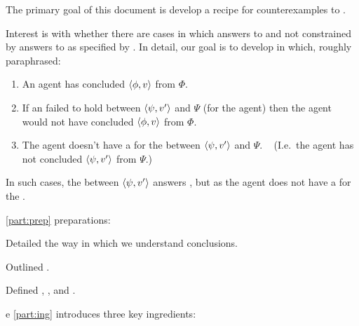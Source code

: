 \begin{note}
  The primary goal of this document is develop a recipe for counterexamples to \issueConstraint{}.

  Interest is with whether there are cases in which answers to \qWhyV{} and not constrained by answers to \qHowV{} as specified by \issueConstraint{}.
  In detail, our goal is to develop  in which, roughly paraphrased:

  \begin{enumerate}
  \item
    An agent has concluded \(\langle \phi, v \rangle\) from \(\Phi\).
  \item
    If an \ros{} failed to hold between \(\langle \psi, v' \rangle\) and \(\Psi\) (for the agent) then the agent would not have concluded \(\langle \phi, v \rangle\) from \(\Phi\).
  \item
    The agent doesn't have a \wit{} for the \ros{} between \(\langle \psi, v' \rangle\) and \(\Psi\).\newline
    \mbox{ }\hfill%
    (I.e.\ the agent has not concluded \(\langle \psi, v' \rangle\) from \(\Psi\).)
  \end{enumerate}

  In such cases, the \ros{} between \(\langle \psi, v' \rangle\) answers \qWhyV{}, but as the agent does not have a \wit{} for the \ros{}.
\end{note}

\begin{note}
  \autoref{part:prep} preparations:

  \begin{TOCEnum}
  \item

    Detailed the way in which we understand conclusions.
  \item

    Outlined .
  \item

    Defined \qWhyV{}, \qHowV{}, and \issueConstraint{}.
  \end{TOCEnum}
\end{note}

\begin{note}e
  \autoref{part:ing} introduces three key ingredients:

  \begin{TOCEnum}
  \item
  \item
  \item
  \end{TOCEnum}

\end{note}

